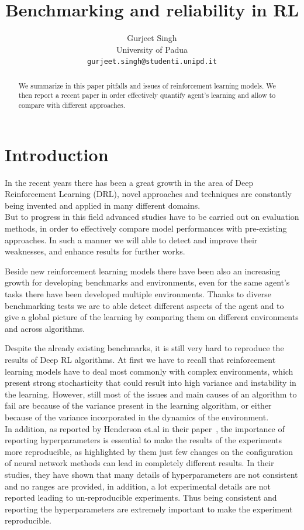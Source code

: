 \documentclass{article}
\title{Benchmarking and reliability in RL}
\author{Gurjeet Singh\\
  University of Padua\\
  \texttt{gurjeet.singh@studenti.unipd.it}
}
\begin{document}
\maketitle

\begin{abstract}
	We summarize in this paper pitfalls and issues of reinforcement learning models. We then report a recent paper in order effectively quantify agent's learning and allow to compare with different approaches.
	
\end{abstract}

\section{Introduction}
In the recent years there has been a great growth in the area of Deep Reinforcement Learning (DRL), novel approaches and techniques are constantly being invented and applied in many different domains.\\
But to progress in this field advanced studies have to be carried out on evaluation methods, in order to effectively compare model performances with pre-existing approaches. In such a manner we will able to detect and improve their weaknesses, and enhance results for further works.

Beside new reinforcement learning models there have been also an increasing growth for developing benchmarks and environments, even for the same agent's tasks there have been developed multiple environments.
Thanks to diverse benchmarking tests we are to able detect different aspects of the agent and to give a global picture of the learning by comparing them on different environments and across algorithms.

Despite the already existing benchmarks, it is still very hard to reproduce the results of Deep RL algorithms. At first we have to recall that reinforcement learning models have to deal most commonly with complex environments, which present strong stochasticity that could result into high variance and instability in the learning. However, still most of the issues and main causes of an algorithm to fail are because of the variance present in the learning algorithm, or either because of the variance incorporated in the dynamics of the environment.\\
In addition, as reported by Henderson et.al in their paper~\cite{DRL01}, the importance of reporting hyperparameters is essential to make the results of the experiments more reproducible, as highlighted by them just few changes on the configuration of neural network methods can lead in completely different results. In their studies, they have shown that many details of hyperparameters are not consistent and no ranges are provided, in addition, a lot experimental details are not reported leading to un-reproducible experiments. Thus being consistent and reporting the hyperparameters are extremely important to make the experiment reproducible.
\end{document}
